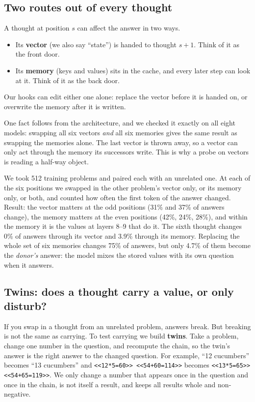 \documentclass{article}
\begin{document}
\subsection{Two routes out of every thought}

A thought at position $s$ can affect the answer in two ways.
\begin{itemize}
\item Its \textbf{vector} (we also say ``state'') is handed to thought $s{+}1$. Think of it as the front door.
\item Its \textbf{memory} (keys and values) sits in the cache, and every later step can look at it. Think of it as the back door.
\end{itemize}
Our hooks can edit either one alone: replace the vector before it is handed on, or overwrite the memory after it is written.

One fact follows from the architecture, and we checked it exactly on all eight models: swapping all six vectors \emph{and} all six memories gives the same result as swapping the memories alone. The last vector is thrown away, so a vector can only act through the memory its successors write. This is why a probe on vectors is reading a half-way object.

\begin{example}
We took 512 training problems and paired each with an unrelated one. At each of the six positions we swapped in the other problem's vector only, or its memory only, or both, and counted how often the first token of the answer changed. Result: the vector matters at the odd positions (31\% and 37\% of answers change), the memory matters at the even positions (42\%, 24\%, 28\%), and within the memory it is the values at layers 8--9 that do it. The sixth thought changes 0\% of answers through its vector and 3.9\% through its memory. Replacing the whole set of six memories changes 75\% of answers, but only 4.7\% of them become the \emph{donor's} answer: the model mixes the stored values with its own question when it answers.
\end{example}

\subsection{Twins: does a thought carry a value, or only disturb?}

If you swap in a thought from an unrelated problem, answers break. But breaking is not the same as carrying. To test carrying we build \textbf{twins}. Take a problem, change one number in the question, and recompute the chain, so the twin's answer is the right answer to the changed question. For example, ``12 cucumbers'' becomes ``13 cucumbers'' and \texttt{<<12*5=60>> <<54+60=114>>} becomes \texttt{<<13*5=65>> <<54+65=119>>}. We only change a number that appears once in the question and once in the chain, is not itself a result, and keeps all results whole and non-negative.
\end{document}
